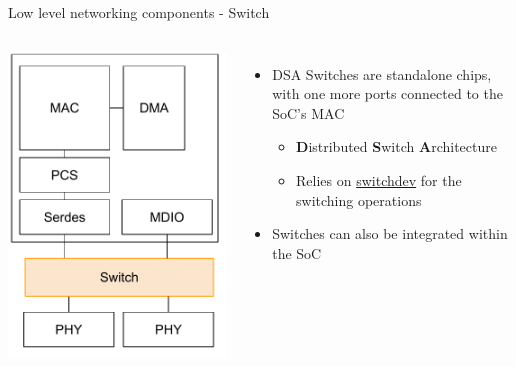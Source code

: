 \begin{frame}{Low level networking components - Switch}
	\begin{columns}
			\includegraphics[width=\textwidth]{slides/networking-driver-overview/net_components_switch.pdf}
		\begin{itemize}
			\item DSA Switches are standalone chips, with one more ports connected to the SoC's MAC
				\begin{itemize}
					\item \textbf{D}istributed \textbf{S}witch \textbf{A}rchitecture
					\item Relies on \href{https://docs.kernel.org/networking/switchdev.html}{switchdev} for the switching operations
				\end{itemize}
			\item Switches can also be integrated within the SoC

\end{itemize}
\end{columns}
\end{frame}
